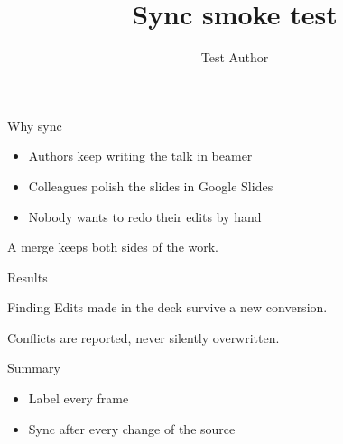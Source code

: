 \documentclass{beamer}
\title{Sync smoke test}
\author{Test Author}
\begin{document}
\begin{frame}[label=intro]{Why sync}
  \begin{itemize}
    \item Authors keep writing the talk in beamer
    \item Colleagues polish the slides in Google Slides
    \item Nobody wants to redo their edits by hand
  \end{itemize}
  \vspace{1em}
  A merge keeps both sides of the work.
\end{frame}

\begin{frame}[label=results]{Results}
  \begin{block}{Finding}
    Edits made in the deck survive a new conversion.
  \end{block}
  \vspace{1em}
  Conflicts are reported, never silently overwritten.
\end{frame}

\begin{frame}[label=end]{Summary}
  \begin{itemize}
    \item Label every frame
    \item Sync after every change of the source
  \end{itemize}
\end{frame}
\end{document}
